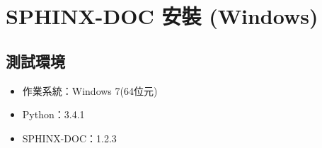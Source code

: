 \documentclass[letterpaper,10pt,english]{sphinxmanual}
\begin{document}
\chapter{SPHINX-DOC 安裝 (Windows)}
\label{_doc/sphinx-doc-win/index::doc}\label{_doc/sphinx-doc-win/index:sphinx-doc-windows}

\section{測試環境}
\label{_doc/sphinx-doc-win/index:id1}\begin{itemize}
\item {} 
作業系統：Windows 7(64位元)

\item {} 
Python：3.4.1

\item {} 
SPHINX-DOC：1.2.3

\end{itemize}
\end{document}
